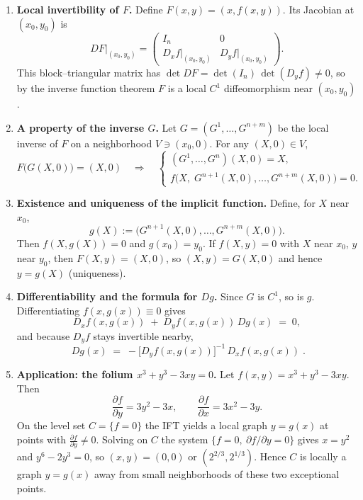 \documentclass[12pt,a4paper]{article}
\theoremstyle{plain}
\theoremstyle{definition}
\theoremstyle{remark}
\theoremstyle{remark}
\begin{document}
	\begin{enumerate}[label=(\alph*), leftmargin=1.2cm]
		
		\item[\textbf{(a)}] \textbf{Local invertibility of $F$.}
		Define $F(x,y)=(x,f(x,y))$. Its Jacobian at $(x_0,y_0)$ is
		\[
		DF\big|_{(x_0,y_0)}=
		\begin{pmatrix}
			I_n & 0\\
			D_x f\big|_{(x_0,y_0)} & D_y f\big|_{(x_0,y_0)}
		\end{pmatrix}.
		\]
		This block–triangular matrix has
		$\det DF=\det(I_n)\,\det(D_y f)\neq0$,
		so by the inverse function theorem $F$ is a local $C^1$ diffeomorphism
		near $(x_0,y_0)$.
		
		\medskip
		
		\item[\textbf{(b)}] \textbf{A property of the inverse $G$.}
		Let $G=(G^1,\dots,G^{n+m})$ be the local inverse of $F$ on a neighborhood
		$V\ni (x_0,0)$. For any $(X,0)\in V$,
		\[
		F\big(G(X,0)\big)=(X,0)
		\quad\Longrightarrow\quad
		\begin{cases}
			(G^1,\dots,G^n)(X,0)=X,\\[2pt]
			\displaystyle f\!\big(X,\;G^{n+1}(X,0),\dots,G^{n+m}(X,0)\big)=0.
		\end{cases}
		\]
		
		\medskip
		
		\item[\textbf{(c)}] \textbf{Existence and uniqueness of the implicit function.}
		Define, for $X$ near $x_0$,
		\[
		g(X):=\big(G^{n+1}(X,0),\dots,G^{n+m}(X,0)\big).
		\]
		Then $f(X,g(X))=0$ and $g(x_0)=y_0$.  
		If $f(X,y)=0$ with $X$ near $x_0$, $y$ near $y_0$, then
		$F(X,y)=(X,0)$, so $(X,y)=G(X,0)$ and hence $y=g(X)$ (uniqueness).
		
		\medskip
		
		\item[\textbf{(d)}] \textbf{Differentiability and the formula for $Dg$.}
		Since $G$ is $C^1$, so is $g$. Differentiating $f(x,g(x))\equiv0$ gives
		\[
		D_x f(x,g(x)) \;+\; D_y f(x,g(x))\,Dg(x) \;=\; 0,
		\]
		and because $D_y f$ stays invertible nearby,
		\[
		\boxed{\; Dg(x) \;=\; -\big[D_y f(x,g(x))\big]^{-1} \, D_x f(x,g(x)) \; }.
		\]
		
		\medskip
		
		\item[\textbf{(e)}] \textbf{Application: the folium $x^3+y^3-3xy=0$.}
		Let $f(x,y)=x^3+y^3-3xy$. Then
		\[
		\frac{\partial f}{\partial y}=3y^2-3x, \qquad
		\frac{\partial f}{\partial x}=3x^2-3y.
		\]
		On the level set $C=\{f=0\}$ the IFT yields a local graph $y=g(x)$ at points
		with $\frac{\partial f}{\partial y}\neq0$.
		Solving on $C$ the system $\{f=0,\ \partial f/\partial y=0\}$ gives
		$x=y^2$ and $y^6-2y^3=0$, so $(x,y)=(0,0)$ or $(2^{2/3},2^{1/3})$.
		Hence $C$ is locally a graph $y=g(x)$ away from small neighborhoods
		of these two exceptional points.
	\end{enumerate}
	
\end{document}
